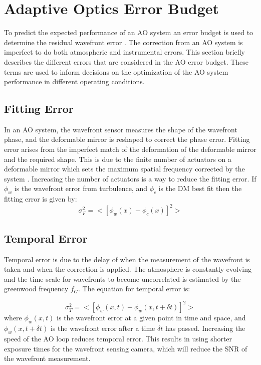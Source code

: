 \section{Adaptive Optics Error Budget}

To predict the expected performance of an AO system an error budget is used to determine the residual wavefront error \citep{hardy}. The correction from an AO system is imperfect to do both atmospheric and instrumental errors. This section briefly describes the different errors that are considered in the AO error budget. These terms are used to inform decisions on the optimization of the AO system performance in different operating conditions. 

\subsection{Fitting Error}

In an AO system, the wavefront sensor measures the shape of the wavefront phase, and the deformable mirror is reshaped to correct the phase error. Fitting error arises from the imperfect match of the deformation of the deformable mirror and the required shape. This is due to the finite number of actuators on a deformable mirror which sets the maximum spatial frequency corrected by the system \citep{roddier1999adaptive}. Increasing the number of actuators is a way to reduce the fitting error. If $\phi_w$ is the wavefront error from turbulence, and $\phi_c$ is the DM best fit then the fitting error is given by:
\begin{equation}
    \sigma_F^2=<[\phi_w(x)-\phi_c(x)]^2>
\end{equation}

\subsection{Temporal Error}

Temporal error is due to the delay of when the measurement of the wavefront is taken and when the correction is applied. The atmosphere is constantly evolving and the time scale for wavefronts to become uncorrelated is estimated by the greenwood frequency $f_G$. The equation for temporal error is:

\begin{equation}
    \sigma_T^2=<[\phi_w(x,t)-\phi_w(x,t+\delta t)]^2>
\end{equation}
\noindent where $\phi_w(x,t)$ is the wavefront error at a given point in time and space, and $\phi_w(x,t+\delta t)$ is the wavefront error after a time $\delta t$ has passed. Increasing the speed of the AO loop reduces temporal error. This results in using shorter exposure times for the wavefront sensing camera, which will reduce the SNR of the wavefront measurement. 

